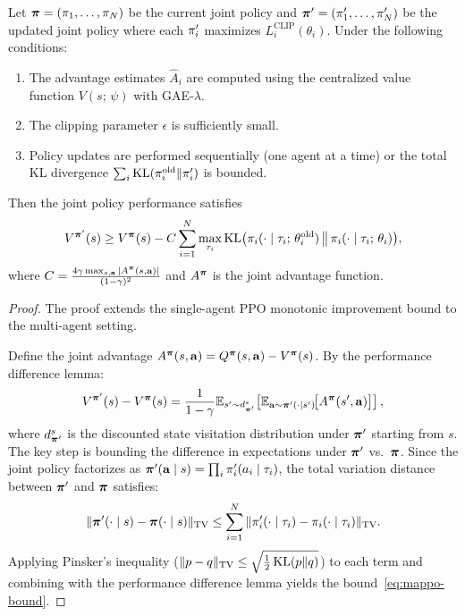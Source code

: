 \documentclass[11pt,a4paper]{article}
\begin{document}
\begin{theorem}
\label{thm:mappo-improvement}
Let $\boldsymbol{\pi} = (\pi_1, \ldots, \pi_N)$ be the current
joint policy and $\boldsymbol{\pi}' = (\pi_1', \ldots, \pi_N')$
be the updated joint policy where each $\pi_i'$ maximizes
$L_i^{\mathrm{CLIP}}(\theta_i)$.  Under the following conditions:
\begin{enumerate}[nosep]
  \item The advantage estimates $\hat{A}_i$ are computed using
    the centralized value function $V(s;\, \psi)$ with GAE-$\lambda$.
  \item The clipping parameter $\epsilon$ is sufficiently small.
  \item Policy updates are performed sequentially (one agent at
    a time) or the total KL divergence $\sum_i
    \operatorname{KL}(\pi_i^{\mathrm{old}} \| \pi_i')$ is bounded.
\end{enumerate}
Then the joint policy performance satisfies
\begin{equation}
\label{eq:mappo-bound}
  V^{\boldsymbol{\pi}'}(s) \geq V^{\boldsymbol{\pi}}(s) - C \sum_{i=1}^N
  \max_{\tau_i} \operatorname{KL}\!\big(\pi_i(\cdot \mid \tau_i;\,
  \theta_i^{\mathrm{old}}) \,\big\|\, \pi_i(\cdot \mid
  \tau_i;\, \theta_i)\big),
\end{equation}
where $C = \frac{4 \gamma \max_{s,\mathbf{a}} |A^{\boldsymbol{\pi}}
(s, \mathbf{a})|}{(1 - \gamma)^2}$ and $A^{\boldsymbol{\pi}}$ is
the joint advantage function.
\end{theorem}

\begin{proof}
The proof extends the single-agent PPO monotonic improvement
bound \citep[Theorem~1]{yu2022} to the multi-agent setting.

Define the joint advantage $A^{\boldsymbol{\pi}}(s, \mathbf{a}) =
Q^{\boldsymbol{\pi}}(s, \mathbf{a}) - V^{\boldsymbol{\pi}}(s)$.  By the
performance difference lemma:
\[
  V^{\boldsymbol{\pi}'}(s) - V^{\boldsymbol{\pi}}(s)
  = \frac{1}{1 - \gamma} \mathbb{E}_{s' \sim d_{\boldsymbol{\pi}'}^s}\!\left[
    \mathbb{E}_{\mathbf{a} \sim \boldsymbol{\pi}'(\cdot \mid s')}\!\big[
      A^{\boldsymbol{\pi}}(s', \mathbf{a})
    \big]
  \right],
\]
where $d_{\boldsymbol{\pi}'}^s$ is the discounted state visitation
distribution under $\boldsymbol{\pi}'$ starting from $s$.  The key step
is bounding the difference in expectations under $\boldsymbol{\pi}'$ vs.\
$\boldsymbol{\pi}$.  Since the joint policy factorizes as
$\boldsymbol{\pi}'(\mathbf{a} \mid s) = \prod_i \pi_i'(a_i \mid
\tau_i)$, the total variation distance between $\boldsymbol{\pi}'$ and
$\boldsymbol{\pi}$ satisfies:
\[
  \|\boldsymbol{\pi}'(\cdot \mid s) - \boldsymbol{\pi}(\cdot \mid s)\|_{\mathrm{TV}}
  \leq \sum_{i=1}^N \|\pi_i'(\cdot \mid \tau_i) -
  \pi_i(\cdot \mid \tau_i)\|_{\mathrm{TV}}.
\]
Applying Pinsker's inequality ($\|p - q\|_{\mathrm{TV}} \leq
\sqrt{\frac{1}{2} \operatorname{KL}(p \| q)}$) to each term and combining
with the performance difference lemma yields the bound~\eqref{eq:mappo-bound}.
\end{proof}
\end{document}
